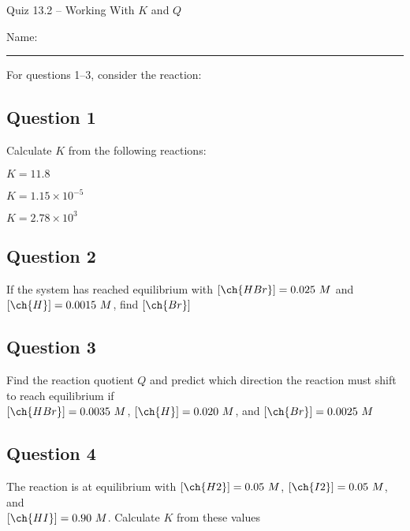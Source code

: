 \documentclass[11pt, letterpaper]{memoir}
\begin{document}
	\begin{center}
		{\large	Quiz 13.2 -- Working With $K$ and $Q$}
	\end{center}
	{\large Name: \rule[-1mm]{4in}{.1pt} 
	
	
	\noindent	
	For questions 1--3, consider the reaction: 
	
	\subsection*{Question 1}
	Calculate $K$ from the following reactions:
	
	 \hspace{1em} $K=11.8$
	
	 \hspace{1em} $K=1.15\times10^{-5}$
	
	 \hspace{1em} $K=2.78\times10^{3}$
	

	\vspace{6em}
	\subsection*{Question 2}
	If the system has reached equilibrium with $\left[\ch{HBr}\right]=0.025~M$ and  $\left[\ch{H}\right]=0.0015~M$, find  $\left[\ch{Br}\right]$
	
	\vspace{3em}
	\subsection*{Question 3}
	Find the reaction quotient $Q$ and predict which direction the reaction must shift to reach equilibrium if \\ $\left[\ch{HBr}\right]=0.0035~M$,  $\left[\ch{H}\right]=0.020~M$, and  $\left[\ch{Br}\right]=0.0025~M$
	
	\vspace{3em}
	\subsection*{Question 4}
	The reaction  is at equilibrium with  $\left[\ch{H2}\right]=0.05~M$,  $\left[\ch{I2}\right]=0.05~M$, and  \\$\left[\ch{HI}\right]=0.90~M$. Calculate $K$ from these values
	
	\vspace{3em}
}
\end{document}
